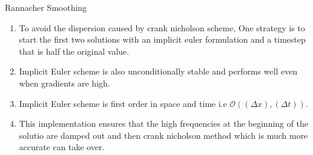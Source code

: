 \documentclass[10pt,compress]{beamer}
\begin{document}
\begin{frame}{Rannacher Smoothing}
\begin{enumerate}
\item To avoid the dispersion caused by crank nicholson scheme, One strategy is to start the first two solutions with an implicit euler formulation and a timestep that is half the original value.
\item Implicit Euler scheme is also unconditionally stable and performs well even when gradients are high.
\item Implicit Euler scheme is first order in space and time i.e $\mathcal{O}((\Delta x),(\Delta t))$.
\item This implementation ensures that the high frequencies at the beginning of the solutio are damped out and then crank nicholson method which is much more accurate can take over.
\end{enumerate}
\end{frame}
\end{document}
